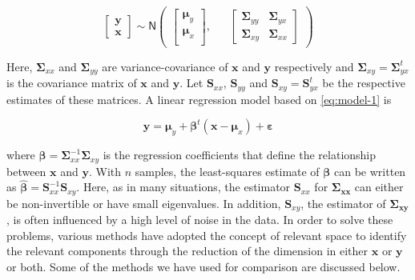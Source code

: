 \documentclass[12pt,3p,authoryear]{elsarticle}
\begin{document}
\begin{equation}
  \begin{bmatrix}
    \mathbf{y} \\ \mathbf{x}
  \end{bmatrix} 
  \sim \mathsf{N}
  \begin{pmatrix}
    \begin{bmatrix}
      \boldsymbol{\mu}_y \\
      \boldsymbol{\mu}_x \\
    \end{bmatrix}, &&
    \begin{bmatrix}
      \boldsymbol{\Sigma}_{yy} & \boldsymbol{\Sigma}_{yx} \\
      \boldsymbol{\Sigma}_{xy} & \boldsymbol{\Sigma}_{xx} 
    \end{bmatrix}
  \end{pmatrix}
  \label{eq:model-1}
\end{equation}

Here, \(\boldsymbol{\Sigma}_{xx}\) and \(\boldsymbol{\Sigma}_{yy}\) are
variance-covariance of \(\mathbf{x}\) and \(\mathbf{y}\) respectively
and \(\boldsymbol{\Sigma}_{xy}=\boldsymbol{\Sigma}_{yx}^t\) is the
covariance matrix of \(\mathbf{x}\) and \(\mathbf{y}\). Let
\(\mathbf{S}_{xx}\), \(\mathbf{S}_{yy}\) and
\(\mathbf{S}_{xy}=\mathbf{S}_{yx}^t\) be the respective estimates of
these matrices. A linear regression model based on \eqref{eq:model-1} is

\begin{equation}
\mathbf{y} = \boldsymbol{\mu}_y + \boldsymbol{\beta}^t\left( \mathbf{x} - \boldsymbol{\mu}_{x} \right) + \boldsymbol{\varepsilon}
\label{eq:reg-model}
\end{equation}

where
\(\boldsymbol{\beta}=\boldsymbol{\Sigma}_{xx}^{-1}\boldsymbol{\Sigma}_{xy}\)
is the regression coefficients that define the relationship between
\(\mathbf{x}\) and \(\mathbf{y}\). With \(n\) samples, the least-squares
estimate of \(\boldsymbol{\beta}\) can be written as
\(\boldsymbol{\hat{\beta}}=\mathbf{S}_{xx}^{-1}\mathbf{S}_{xy}\). Here,
as in many situations, the estimator \(\mathbf{S}_{xx}\) for
\(\boldsymbol{\Sigma_{xx}}\) can either be non-invertible or have small
eigenvalues. In addition, \(\mathbf{S}_{xy}\), the estimator of
\(\boldsymbol{\Sigma_{xy}}\), is often influenced by a high level of
noise in the data. In order to solve these problems, various methods
have adopted the concept of relevant space to identify the relevant
components through the reduction of the dimension in either
\(\mathbf{x}\) or \(\mathbf{y}\) or both. Some of the methods we have
used for comparison are discussed below.
\end{document}
